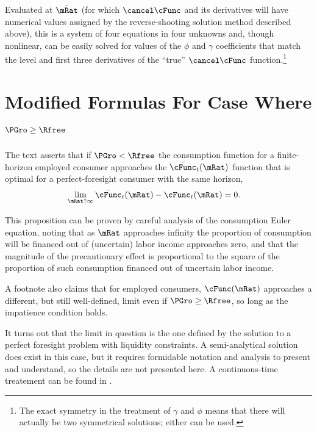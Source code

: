 \documentclass{handout}
\begin{document}
Evaluated at $\bar{\mRat}$ (for which $\psavFunc$ and its derivatives will have numerical values
assigned by the reverse-shooting solution method described above), this is a system of four equations in four unknowns and, though nonlinear, can be easily solved for 
values of the $\phi$ and $\gamma$ coefficients that match the level and first three derivatives
of the ``true'' $\psavFunc$ function.\footnote{The exact symmetry in
  the treatment of $\gamma$ and $\phi$ means that there will actually
  be two symmetrical solutions; either can be used.}




\section{Modified Formulas For Case Where $\PGro \geq \Rfree$} \label{sec:PGroGEQRfree}

The text asserts that if $\PGro < \Rfree$ the consumption function for a finite-horizon employed consumer approaches
the $\bar{\cFunc}_{t}(\mRat)$ function that is optimal for a perfect-foresight
consumer with the same horizon,
\begin{equation}\begin{gathered}\begin{aligned}
  \lim_{\mRat \uparrow \infty} \bar{\cFunc}_{t}(\mRat) - \cFunc_{t}(\mRat) & =  0
.
\end{aligned}\end{gathered}\end{equation}

This proposition can be proven by careful analysis of the consumption Euler equation,
noting that as $\mRat$ approaches infinity the proportion of consumption will
be financed out of (uncertain) labor income approaches zero, and that the magnitude
of the precautionary effect is proportional to the square of the proportion of such
consumption financed out of uncertain labor income.

A footnote also claims that for employed consumers, $\cFunc(\mRat)$
approaches a different, but still well-defined, limit even if $\PGro
\geq \Rfree$, so long as the impatience condition holds.

It turns out that the limit in question is the one defined by the solution to a
perfect foresight problem with liquidity constraints.  A semi-analytical solution does
exist in this case, but it requires formidable notation and analysis to present and
understand, so the details are not presented here.  A continuous-time treatement
can be found in \cite{parkLiqConstrContinuous}.

\pagebreak

\end{document}
